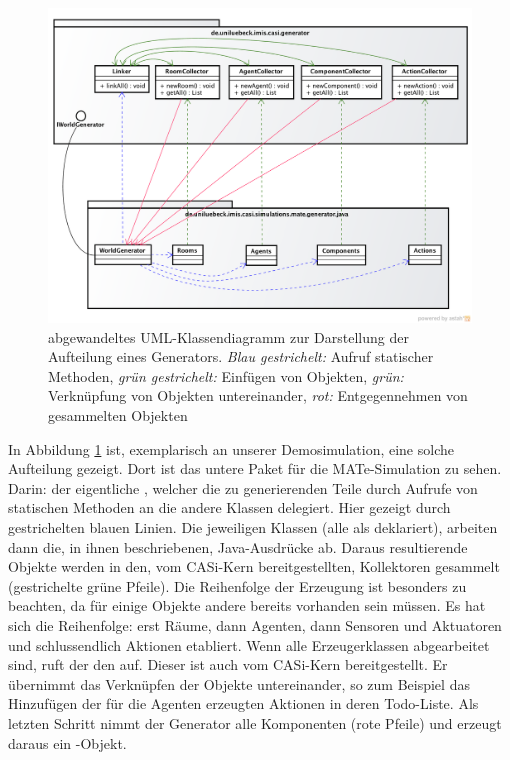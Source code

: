 \begin{figure}[htb]
  \begin{center}
    \includegraphics[width=\textwidth]{pics/howToGenerateAWorld.png}
  \end{center}
  \caption{abgewandeltes UML-Klassendiagramm zur Darstellung der Aufteilung eines Generators. \emph{Blau gestrichelt:} Aufruf statischer Methoden, \emph{grün gestrichelt:} Einfügen von Objekten, \emph{grün:} Verknüpfung von Objekten untereinander, \emph{rot:} Entgegennehmen von gesammelten Objekten}
  \label{fig:howToGenerateAWorld}
\end{figure}
In Abbildung \ref{fig:howToGenerateAWorld} ist, exemplarisch an unserer Demosimulation, eine solche Aufteilung gezeigt.
Dort ist das untere Paket für die MATe-Simulation zu sehen. Darin: der eigentliche , welcher die zu generierenden Teile durch Aufrufe von statischen Methoden an die andere Klassen delegiert. Hier gezeigt durch gestrichelten blauen Linien.
Die jeweiligen Klassen (alle als  deklariert), arbeiten dann die, in ihnen beschriebenen, Java-Ausdrücke ab.
Daraus resultierende Objekte werden in den, vom CASi-Kern bereitgestellten, Kollektoren gesammelt (gestrichelte grüne Pfeile). Die Reihenfolge der Erzeugung ist besonders zu beachten, da für einige Objekte andere bereits vorhanden sein müssen. Es hat sich die Reihenfolge: erst Räume, dann Agenten, dann Sensoren und Aktuatoren und schlussendlich Aktionen etabliert.
Wenn alle Erzeugerklassen abgearbeitet sind, ruft der  den  auf. Dieser ist auch vom CASi-Kern bereitgestellt. Er übernimmt das Verknüpfen der Objekte untereinander, so zum Beispiel das Hinzufügen der für die Agenten erzeugten Aktionen in deren Todo-Liste.
Als letzten Schritt nimmt der Generator alle Komponenten (rote Pfeile) und erzeugt daraus ein -Objekt.

